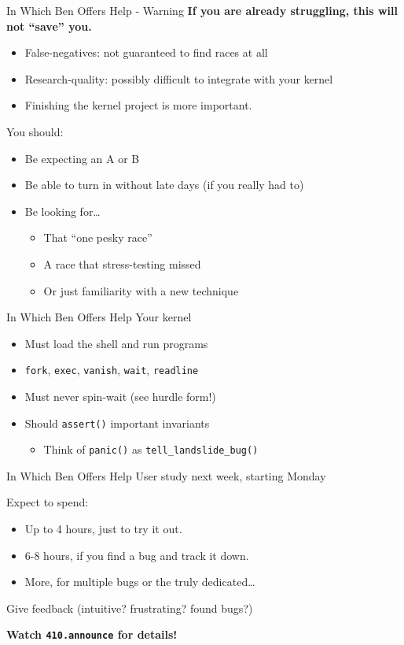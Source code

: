 \documentclass[xcolor=dvipsnames]{beamer}
\begin{document}
\begin{frame}{In Which Ben Offers Help - Warning}
	\textbf{If you are already struggling, this will not ``save'' you.}
	\begin{itemize}
		\item False-negatives: not guaranteed to find races at all
		\item Research-quality: possibly difficult to integrate with your kernel
		\item Finishing the kernel project is more important.
	\end{itemize}
	You should:
	\begin{itemize}
		\item Be expecting an A or B
		\item Be able to turn in without late days (if you really had to)
		\item Be looking for\ldots
			\begin{itemize}
				\item That ``one pesky race''
				\item A race that stress-testing missed
				\item Or just familiarity with a new technique
			\end{itemize}
	\end{itemize}
\end{frame}

\begin{frame}{In Which Ben Offers Help}
	Your kernel
	\begin{itemize}
		\item Must load the shell and run programs
		\item \texttt{fork},
			\texttt{exec},
			\texttt{vanish},
			\texttt{wait},
			\texttt{readline}
		\item Must never spin-wait (see hurdle form!)
		\item Should \texttt{assert()} important invariants
		\begin{itemize}
			\item Think of \texttt{panic()} as \texttt{tell\_landslide\_bug()}
		\end{itemize}
	\end{itemize}
\end{frame}

\begin{frame}{In Which Ben Offers Help}
	User study next week, starting Monday

	\linegap
	Expect to spend:
	\begin{itemize}
		\item Up to 4 hours, just to try it out.
		\item 6-8 hours, if you find a bug and track it down.
		\item More, for multiple bugs or the truly dedicated\ldots
	\end{itemize}
	\linegap

	Give feedback (intuitive? frustrating? found bugs?)

	\linegap
	{\bf Watch \texttt{410.announce} for details!}
\end{frame}
\end{document}
